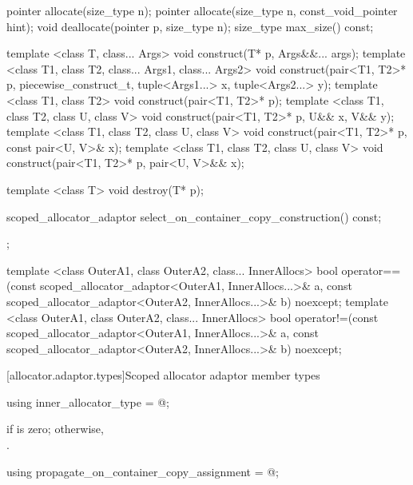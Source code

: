 \begin{codeblock}
{{    pointer allocate(size_type n);
    pointer allocate(size_type n, const_void_pointer hint);
    void deallocate(pointer p, size_type n);
    size_type max_size() const;

    template <class T, class... Args>
      void construct(T* p, Args&&... args);
    template <class T1, class T2, class... Args1, class... Args2>
      void construct(pair<T1, T2>* p, piecewise_construct_t,
                     tuple<Args1...> x, tuple<Args2...> y);
    template <class T1, class T2>
      void construct(pair<T1, T2>* p);
    template <class T1, class T2, class U, class V>
      void construct(pair<T1, T2>* p, U&& x, V&& y);
    template <class T1, class T2, class U, class V>
      void construct(pair<T1, T2>* p, const pair<U, V>& x);
    template <class T1, class T2, class U, class V>
      void construct(pair<T1, T2>* p, pair<U, V>&& x);

    template <class T>
      void destroy(T* p);

    scoped_allocator_adaptor select_on_container_copy_construction() const;
  };

  template <class OuterA1, class OuterA2, class... InnerAllocs>
    bool operator==(const scoped_allocator_adaptor<OuterA1, InnerAllocs...>& a,
                    const scoped_allocator_adaptor<OuterA2, InnerAllocs...>& b) noexcept;
  template <class OuterA1, class OuterA2, class... InnerAllocs>
    bool operator!=(const scoped_allocator_adaptor<OuterA1, InnerAllocs...>& a,
                    const scoped_allocator_adaptor<OuterA2, InnerAllocs...>& b) noexcept;
}
\end{codeblock}

[allocator.adaptor.types]{Scoped allocator adaptor member types}

%
\begin{itemdecl}
using inner_allocator_type = @\seebelow@;
\end{itemdecl}

\begin{itemdescr}
\pnum
\ctype {} if  is
zero; otherwise,\\ .
\end{itemdescr}

%
\begin{itemdecl}
using propagate_on_container_copy_assignment = @\seebelow@;
\end{itemdecl}

